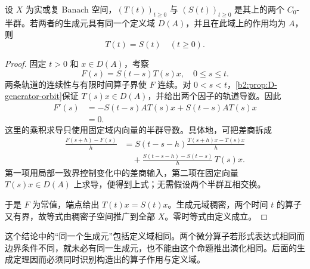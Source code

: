 \begin{proposition}[生成元决定半群]\label{b2:prop:D-generator-uniqueness}
设 \(X\) 为实或复 Banach 空间，\((T(t))_{t\geq0}\) 与 \((S(t))_{t\geq0}\) 是其上的两个 \(C_0\)-半群。若两者的生成元具有同一个定义域 \(D(A)\)，并且在此域上的作用均为 \(A\)，则
\[
 T(t)=S(t)\quad(t\geq0).
\]
\end{proposition}
\begin{proof}
固定 \(t>0\) 和 \(x\in D(A)\)，考察
\[
 F(s)=S(t-s)T(s)x,\quad 0\leq s\leq t.
\]
两条轨道的连续性与有限时间算子界使 \(F\) 连续。对 \(0<s<t\)，\cref{b2:prop:D-generator-orbit}保证 \(T(s)x\in D(A)\)，并给出两个因子的轨道导数。因此
\[
 \begin{aligned}
 F'(s)
 &=-S(t-s)AT(s)x+S(t-s)AT(s)x\\
 &=0.
 \end{aligned}
\]
这里的乘积求导只使用固定域内向量的半群导数。具体地，可把差商拆成
\[
 \begin{aligned}
 \frac{F(s+h)-F(s)}h
 &=S(t-s-h)\frac{T(s+h)x-T(s)x}{h}\\
 &\quad+\frac{S(t-s-h)-S(t-s)}h\,T(s)x.
 \end{aligned}
\]
第一项用局部一致界控制变化中的差商输入，第二项在固定向量 \(T(s)x\in D(A)\) 上求导，便得到上式；无需假设两个半群互相交换。

于是 \(F\) 为常值，端点给出 \(T(t)x=S(t)x\)。生成元域稠密，两个时间 \(t\) 的算子又有界，故等式由稠密子空间推广到全部 \(X\)。零时等式由定义成立。
\end{proof}
这个结论中的“同一个生成元”包括定义域相同。两个微分算子若形式表达式相同而边界条件不同，就未必有同一生成元，也不能由这个命题推出演化相同。后面的生成定理因而必须同时识别构造出的算子作用与定义域。

